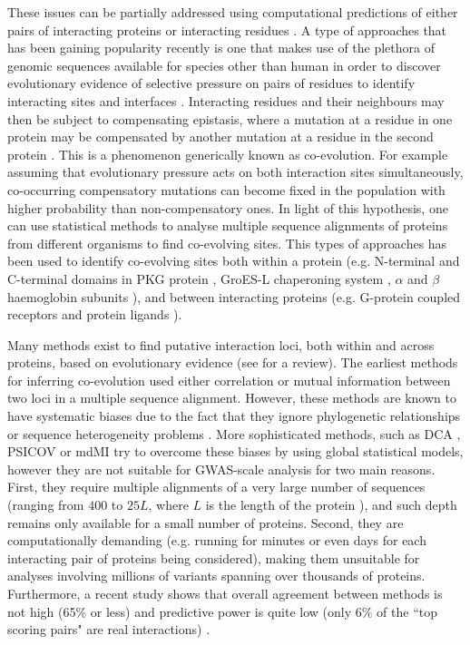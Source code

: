 These issues can be partially addressed using computational predictions of either pairs of interacting proteins or interacting residues \cite{shoemaker2007decipheringP2}. 
A type of approaches that has been gaining popularity recently is one that makes use of the plethora of genomic sequences available for species other than human in order to discover evolutionary evidence of selective pressure on pairs of residues to identify interacting sites and interfaces \cite{marks2012protein}. 
Interacting residues and their neighbours may then be subject to compensating epistasis, where a mutation at a residue in one protein may be compensated by another mutation at a residue in the second protein \cite{pazos1997correlated}.
This is a phenomenon generically known as co-evolution. 
For example assuming that evolutionary pressure acts on both interaction sites simultaneously, co-occurring compensatory mutations can become fixed in the population with higher probability than non-compensatory ones. 
In light of this hypothesis, one can use statistical methods to analyse multiple sequence alignments of proteins from different organisms to find co-evolving sites. 
This types of approaches has been used to identify co-evolving sites both within a protein (e.g. N-terminal and C-terminal domains in PKG protein \cite{goh2000co}, GroES-L chaperoning system \cite{ruiz2013coevolution}, $\alpha$ and $\beta$ haemoglobin subunits \cite{pazos1997correlated}), and between interacting proteins (e.g. G-protein coupled receptors and protein ligands \cite{goh2000co}).

Many methods exist to find putative interaction loci, both within and across proteins, based on evolutionary evidence (see \cite{de2013emerging} for a review). 
The earliest methods for inferring co-evolution used either correlation or mutual information between two loci \cite{marks2012protein} in a multiple sequence alignment. 
However, these methods are known to have systematic biases due to the fact that they ignore phylogenetic relationships \cite{de2013emerging} or sequence heterogeneity problems \cite{weigt2009identification}. 
More sophisticated methods, such as DCA \cite{morcos2011direct}, PSICOV \cite{jones2012psicov} or mdMI \cite{clark2014multidimensional} try to overcome these biases by using global statistical models, however they are not suitable for GWAS-scale analysis for two main reasons. 
First, they require multiple alignments of a very large number of sequences (ranging from $400$ to $25L$, where $L$ is the length of the protein \cite{clark2014multidimensional}), and such depth remains only available for a small number of proteins. 
Second, they are computationally demanding (e.g. running for minutes or even days for each interacting pair of proteins being considered), making them unsuitable for analyses involving millions of variants spanning over thousands of proteins. 
Furthermore, a recent study shows that overall agreement between methods is not high (65\% or less) and predictive power is quite low (only 6\% of the ``top scoring pairs" are real interactions) \cite{clark2014multidimensional}.


